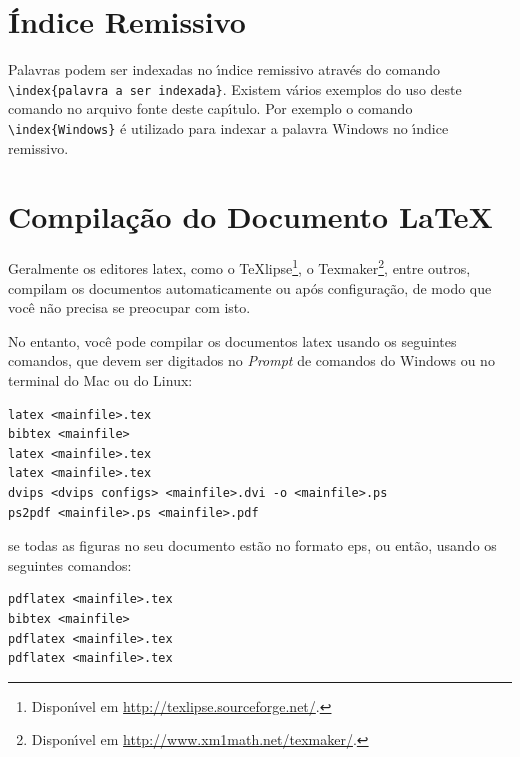 \section{\'Indice Remissivo}\label{sec:indice}

Palavras podem ser indexadas no \'{\i}ndice remissivo atrav\'es do comando \verb|\index{palavra a ser indexada}|. Existem v\'arios exemplos do uso deste comando no arquivo fonte deste cap\'{\i}tulo. Por exemplo o comando \verb|\index{Windows}| \'e utilizado para indexar a palavra Windows no \'{\i}ndice remissivo.

\section{Compila\c{c}\~ao do Documento \LaTeX}\label{sec:compilar}

Geralmente os editores \gls{latex}, como o TeXlipse\footnote{Dispon\'{\i}vel em \url{http://texlipse.sourceforge.net/}.}, o Texmaker\footnote{Dispon\'{\i}vel em \url{http://www.xm1math.net/texmaker/}.}, entre outros, compilam os documentos automaticamente ou ap\'os configura\c{c}\~ao, de modo que voc\^e n\~ao precisa se preocupar com isto.

No entanto, voc\^e pode compilar os documentos \gls{latex} usando os seguintes comandos, que devem ser digitados no \textit{Prompt} de comandos do Windows ou no terminal do Mac ou do Linux:

\begin{SingleSpacing}%
\begin{verbatim}
latex <mainfile>.tex
bibtex <mainfile>
latex <mainfile>.tex
latex <mainfile>.tex
dvips <dvips configs> <mainfile>.dvi -o <mainfile>.ps
ps2pdf <mainfile>.ps <mainfile>.pdf
\end{verbatim}
\end{SingleSpacing}

\noindent se todas as figuras no seu documento est\~ao no formato \gls{eps}, ou ent\~ao, usando os seguintes comandos:

\begin{SingleSpacing}%
\begin{verbatim}
pdflatex <mainfile>.tex
bibtex <mainfile>
pdflatex <mainfile>.tex
pdflatex <mainfile>.tex
\end{verbatim}
\end{SingleSpacing}

